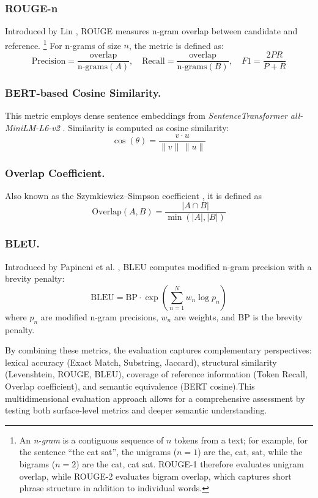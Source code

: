 \subsubsection{ROUGE-n} 
Introduced by Lin \cite{lin2004rouge}, ROUGE measures n-gram overlap between candidate and reference. 
\footnote{An \emph{n-gram} is a contiguous sequence of \(n\) tokens from a text; for example, for the sentence ``the cat sat'', the unigrams (\(n=1\)) are {the, cat, sat}, while the bigrams (\(n=2\)) are {the cat, cat sat}.
ROUGE-1 therefore evaluates unigram overlap, while ROUGE-2 evaluates bigram overlap, which captures short phrase structure in addition to individual words. }
For n-grams of size \(n\), the metric is defined as:
\[
\text{Precision} = \frac{\text{overlap}}{\text{n-grams}(A)}, \quad
\text{Recall} = \frac{\text{overlap}}{\text{n-grams}(B)}, \quad
F1 = \frac{2PR}{P+R}
\]

\subsubsection{BERT-based Cosine Similarity.} 
This metric employs dense sentence embeddings from \textit{SentenceTransformer all-MiniLM-L6-v2} \cite{reimers2019sentence}. 
Similarity is computed as cosine similarity:
\[
\cos(\theta) = \frac{v \cdot u}{\|v\| \, \|u\|}
\]

\subsubsection{Overlap Coefficient.} 
Also known as the Szymkiewicz--Simpson coefficient \cite{simpson1960similarity}, it is defined as
\[
\text{Overlap}(A,B) = \frac{|A \cap B|}{\min(|A|,|B|)}
\]

\subsubsection{BLEU.} 
Introduced by Papineni et al. \cite{papineni2002bleu}, BLEU computes modified n-gram precision with a brevity penalty:
\[
\text{BLEU} = \text{BP} \cdot \exp\left(\sum_{n=1}^{N} w_n \log p_n\right)
\]
where \(p_n\) are modified n-gram precisions, \(w_n\) are weights, and BP is the brevity penalty.

By combining these metrics, the evaluation captures complementary perspectives:  
lexical accuracy (Exact Match, Substring, Jaccard), structural similarity (Levenshtein, ROUGE, BLEU), coverage of reference information (Token Recall, Overlap coefficient), and semantic equivalence (BERT cosine).This multidimensional evaluation approach allows for a comprehensive assessment by testing both surface-level metrics and deeper semantic understanding.

